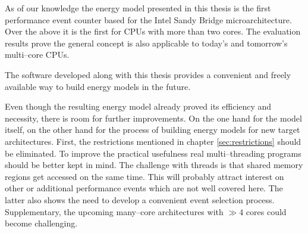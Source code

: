 
As of our knowledge the energy model presented in this thesis is the first
performance event counter based for the Intel\TReg{} Sandy Bridge
microarchitecture. Over the above it is the first for CPUs with more than two
cores. The evaluation results prove the general concept is also applicable to
today's and tomorrow's multi--core CPUs.

The software developed along with this thesis provides a convenient and freely
available way to build energy models in the future.


\label{sec:problems}

Even though the resulting energy model already proved its efficiency and
necessity, there is room for further improvements. On the one hand for the model
itself, on the other hand for the process of building energy models for new
target architectures. First, the restrictions mentioned in chapter
\ref{sec:restrictions} should be eliminated. To improve the practical usefulness
real multi--threading programs should be better kept in mind. The challenge with
threads is that shared memory regions get accessed on the same time. This will
probably attract interest on other or additional performance events which are
not well covered here. The latter also shows the need to develop a convenient
event selection process. Supplementary, the upcoming many--core architectures
with $\gg 4$ cores could become challenging.

